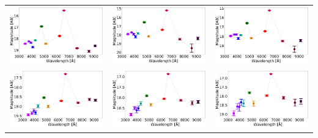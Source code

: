 \begin{table}
\begin{tabular}{ccc}
\includegraphics[width=0.3\linewidth, clip]{photopectrum_splus_MC0115-112627_aper.pdf} & \includegraphics[width=0.3\linewidth, clip]{photopectrum_splus_MC0115-112627_auto.pdf} & \includegraphics[width=0.3\linewidth, clip]{photopectrum_splus_MC0115-112627_petro.pdf} \\
\includegraphics[width=0.3\linewidth, clip]{photopectrum_splus_MC0115-147165_aper.pdf} & \includegraphics[width=0.3\linewidth, clip]{photopectrum_splus_MC0115-147165_auto.pdf} & \includegraphics[width=0.3\linewidth, clip]{photopectrum_splus_MC0115-147165_petro.pdf} \\

\end{tabular}
\end{table}
